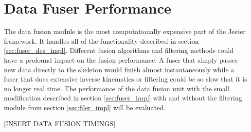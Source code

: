 \section{Data Fuser Performance}

The data fusion module is the most computationally expensive part of the Jester framework. It handles all of the functionality described in section \ref{sec:fuser_des_impl}. Different fusion algorithms and filtering methods could have a profound impact on the fusion performance. A fuser that simply passes new data directly to the skeleton would finish almost instantaneously while a fuser that does extensive inverse kinematics or filtering could be so slow that it is no longer real time. The performance of the data fusion unit with the small modification described in section \ref{sec:fuser_impl} with and without the filtering module from section \ref{sec:filer_impl} will be evaluated.

[INSERT DATA FUSION TIMINGS]
